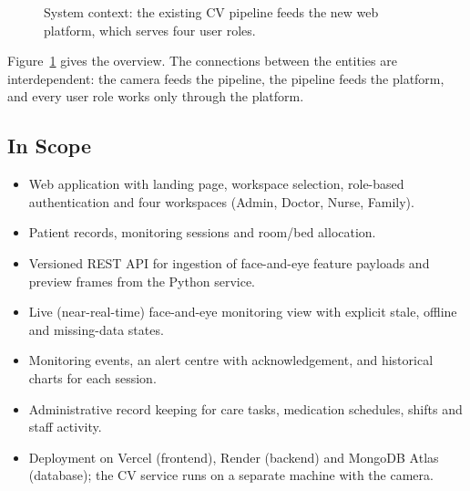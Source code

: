 \documentclass[a4paper,11pt]{scrreprt}
\begin{document}
\begin{figure}[h!]
\centering
{}
\caption{System context: the existing CV pipeline feeds the new web platform, which serves four user roles.}
\label{fig:context}
\end{figure}

Figure~\ref{fig:context} gives the overview. The connections between the entities are interdependent: the camera feeds the pipeline, the pipeline feeds the platform, and every user role works only through the platform.

\subsection{In Scope}
\begin{itemize}
  \item Web application with landing page, workspace selection, role-based authentication and four workspaces (Admin, Doctor, Nurse, Family).
  \item Patient records, monitoring sessions and room/bed allocation.
  \item Versioned REST API for ingestion of face-and-eye feature payloads and preview frames from the Python service.
  \item Live (near-real-time) face-and-eye monitoring view with explicit stale, offline and missing-data states.
  \item Monitoring events, an alert centre with acknowledgement, and historical charts for each session.
  \item Administrative record keeping for care tasks, medication schedules, shifts and staff activity.
  \item Deployment on Vercel (frontend), Render (backend) and MongoDB Atlas (database); the CV service runs on a separate machine with the camera.
\end{itemize}
\end{document}
